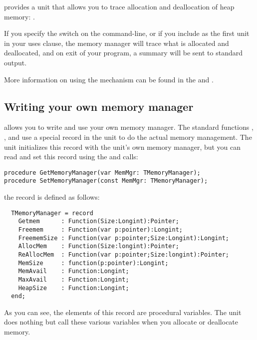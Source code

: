 {\fpc provides a unit that allows you to trace allocation and deallocation
of heap memory: .

If you specify the  switch on the command-line, or if you include
 as the first unit in your uses clause, the memory manager
will trace what is allocated and deallocated, and on exit of your program,
a summary will be sent to standard output.

More information on using the  mechanism can be found in the
\userref and \unitsref.

\subsection{Writing your own memory manager}

\fpc allows you to write and use your own memory manager. The standard
functions , ,  and 
use a special record in the  unit to do the actual memory management.
The  unit initializes this record with the  unit's own memory
manager, but you can read and set this record using the
 and  calls:
\begin{verbatim}
procedure GetMemoryManager(var MemMgr: TMemoryManager);
procedure SetMemoryManager(const MemMgr: TMemoryManager);
\end{verbatim}

the  record is defined as follows:
\begin{verbatim}
  TMemoryManager = record
    Getmem      : Function(Size:Longint):Pointer;
    Freemem     : Function(var p:pointer):Longint;
    FreememSize : Function(var p:pointer;Size:Longint):Longint;
    AllocMem    : Function(Size:longint):Pointer;
    ReAllocMem  : Function(var p:pointer;Size:longint):Pointer;
    MemSize     : function(p:pointer):Longint;
    MemAvail    : Function:Longint;
    MaxAvail    : Function:Longint;
    HeapSize    : Function:Longint;
  end;
\end{verbatim}

As you can see, the elements of this record are procedural variables.
The  unit does nothing but call these various variables when you
allocate or deallocate memory.

}

